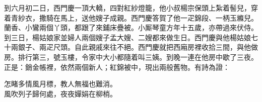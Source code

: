到六月初二日，西門慶一頂大轎，四對紅紗燈籠，他小叔楊宗保頭上紮着髻兒，穿着青紗衣，撒騎在馬上，送他嫂子成親。西門慶答賀了他一疋錦段、一柄玉縧兒。蘭香、小鸞兩個丫頭，都跟了來鋪床疊被。小厮琴童方年十五歲，亦帶過來伏侍。到三日，楊姑娘家並婦人兩個嫂子孟大嫂、二嫂都來做生日。西門慶與他楊姑娘七十兩銀子、兩疋尺頭。自此親戚來往不絕。西門慶就把西廂房裡收拾三間，與他做房。排行第三，號玉樓，令家中大小都隨着叫三姨。到晚一連在他房中歇了三夜。正是：銷金帳裡，依然兩個新人；紅錦被中，現出兩般舊物。有詩為證：

\begin{myquote} 
怎睹多情風月標，教人無福也難消。\\風吹列子歸何處，夜夜嬋娟在柳梢。
\end{myquote} 
